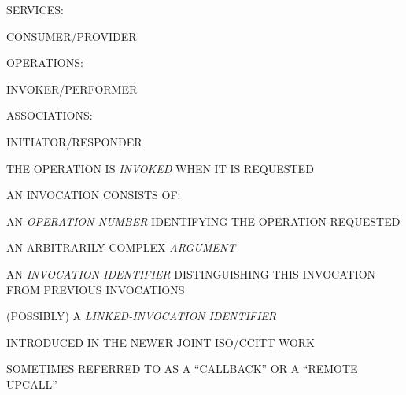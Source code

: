 \begin{bwslide}
\begin{nrtc}
\item	SERVICES: 
    \begin{nrtc}
    \item	CONSUMER/PROVIDER
    \end{nrtc}

\item	OPERATIONS: 
    \begin{nrtc}
    \item	INVOKER/PERFORMER
    \end{nrtc}

\item	ASSOCIATIONS: 
    \begin{nrtc}
    \item	INITIATOR/RESPONDER
    \end{nrtc}
\end{nrtc}
\end{bwslide}


\begin{bwslide}

\begin{nrtc}
\item	THE OPERATION IS \emph{INVOKED} WHEN IT IS REQUESTED

\item	AN INVOCATION CONSISTS OF:
    \begin{nrtc}
    \item	AN \emph{OPERATION NUMBER} IDENTIFYING THE OPERATION REQUESTED

    \item	AN ARBITRARILY COMPLEX \emph{ARGUMENT}

    \item	AN \emph{INVOCATION IDENTIFIER} DISTINGUISHING THIS INVOCATION
		FROM PREVIOUS INVOCATIONS

    \item	(POSSIBLY) A \emph{LINKED-INVOCATION IDENTIFIER}
    \end{nrtc}
\end{nrtc}
\end{bwslide}


\begin{bwslide}

\begin{nrtc}
\item	INTRODUCED IN THE NEWER JOINT ISO/CCITT WORK

\item	SOMETIMES REFERRED TO AS A ``CALLBACK'' OR A ``REMOTE UPCALL''
\end{nrtc}
\end{bwslide}


